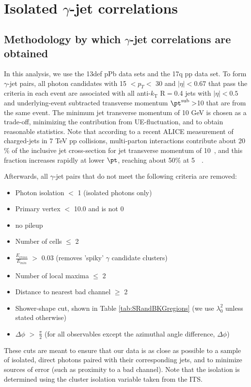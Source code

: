 \section{Isolated $\gamma$-jet correlations}
\label{sec:GammaJet}
\subsection{Methodology by which $\gamma$-jet correlations are obtained}
\label{sec:GammaJetProcedure}
 In this analysis, we use the 13def pPb data sets and the 17q pp data set. To form $\gamma$-jet pairs, all photon candidates with 15 \GeVc $< p_{T} <$  30 \GeVc and $|\eta|<0.67$ that pass the criteria in each event are associated with all anti-$k_{\mathrm{T}}$ R$=$0.4 jets with $|\eta|<0.5$ and underlying-event subtracted transverse momentum $\pt^{\mathrm{sub}}>$10 \GeVc that are from the same event. The minimum jet transverse momentum of 10 GeV is chosen as a trade-off, minimizing the contribution from UE-fluctuation, and to obtain reasonable statistics. Note that according to a recent ALICE measurement of charged-jets in 7 TeV pp collisions, multi-parton interactions contribute about 20$\%$ of the inclusive jet cross-section for jet transverse momentum of 10~\GeVc, and this fraction increases rapidly at lower $\pt$, reaching about 50$\%$ at 5~\GeVc~\cite{Acharya:2018eat}. 

Afterwards, all $\gamma$-jet pairs that do not meet the following criteria are removed:
\begin{itemize}
    \item Photon isolation $<$ 1 \GeVc (isolated photons only)
    \item Primary vertex $<$ 10.0 and is not 0
    \item no pileup
    \item Number of cells $\leq$ 2
    \item $\frac{E_{cross}}{E_{min}}$ $>$ 0.03 (removes 'spiky' $\gamma$ candidate clusters)
    \item Number of local maxima $\leq$ 2
    \item Distance to nearest bad channel $\geq$ 2
    \item Shower-shape cut, shown in Table \ref{tab:SRandBKGregions} (we use $\lambda_{0}^2$ unless stated otherwise)
    \item $\Delta \phi$ $>$ $\frac{\pi}{2}$ (for all observables except the azimuthal angle difference, $\Delta \phi$)
\end{itemize}
These cuts are meant to ensure that our data is as close as possible to a sample of isolated, direct photons paired with their corresponding jets, and to minimize sources of error (such as proximity to a bad channel). Note that the isolation is determined using the cluster isolation variable taken from the ITS.

